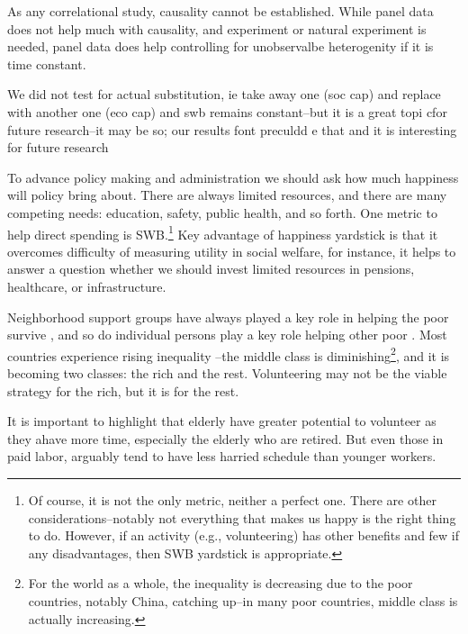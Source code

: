 \documentclass[10pt, letterpaper]{article}
\begin{document}
\begin{spacing}{1.4}
As any correlational study, causality cannot be established. While panel data
does not help much with causality, and experiment or natural experiment is
needed, panel data does help controlling for unobservalbe heterogenity if it is
time constant. 

We did not test for actual substitution, ie take away one (soc cap) and replace
with another one (eco cap) and swb remains constant--but it is a great topi cfor
future research--it may be so; our results font preculdd e that and it is
interesting for future research


To advance policy making and
administration we should ask how much happiness will policy bring
about. There are always limited resources, and there are many competing needs: education, safety, public
health, and so forth. One metric to help direct spending is SWB.\footnote{Of
  course, it is not the only metric, neither a perfect one. There are other
  considerations--notably not everything that makes us happy is the right thing
  to do. However, if an activity (e.g., volunteering) has other benefits and few if any
  disadvantages, then SWB yardstick is appropriate.}
Key  advantage of happiness yardstick is that it overcomes difficulty
of measuring utility in social welfare, for instance, it helps to answer
a question whether we should  invest
limited resources in pensions, healthcare, or infrastructure.


Neighborhood support groups have always played a key role in helping the poor
survive \citep{saegert2002social}, and so do individual persons play a key role
helping other poor \citep{mazelis2017surviving}. Most countries experience
rising inequality \citep{piketty03,mackintosh13,oecd08,verbeek15}--the middle
class is diminishing\footnote{For the world as a whole, the inequality is
  decreasing due to the poor countries, notably China, catching up--in many poor
  countries, middle class is actually increasing.}, and it is becoming two classes: the rich and the
rest. Volunteering may not be the viable strategy for the rich, but it is for the rest.
 

It is important to highlight that elderly have greater potential to volunteer as
they ahave more time, especially the elderly who are retired. But even those in
paid labor, arguably tend to have less harried schedule than younger workers.




\end{spacing}
\end{document}
